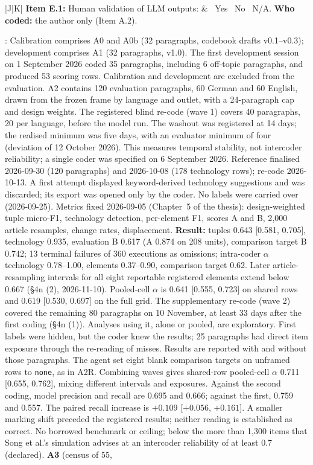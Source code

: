 \documentclass[12pt]{article}
\providecommand{\checked}{\ding{110}}   %
\providecommand{\unchecked}{\ding{111}} %
\begin{document}
{\begin{longtable}{|J|K|}
\textbf{Item E.1:} Human validation of LLM outputs:
&
\checked~Yes \quad \unchecked~No \quad \unchecked~N/A. \textbf{Who coded:} the author only (Item A.2).\par\smallskip
{}: Calibration comprises A0 and A0b (32 paragraphs, codebook drafts v0.1--v0.3); development comprises A1 (32 paragraphs, v1.0). The first development session on 1 September 2026 coded 35 paragraphs, including 6 off-topic paragraphs, and produced 53 scoring rows. Calibration and development are excluded from the evaluation. A2 contains 120 evaluation paragraphs, 60 German and 60 English, drawn from the frozen frame by language and outlet, with a 24-paragraph cap and design weights. The registered blind re-code (wave 1) covers 40 paragraphs, 20 per language, before the model run. The washout was registered at 14 days; the realised minimum was five days, with an evaluator minimum of four (deviation of 12 October 2026). This measures temporal stability, not intercoder reliability; a single coder was specified on 6 September 2026. Reference finalised 2026-09-30 (120 paragraphs) and 2026-10-08 (178 technology rows); re-code 2026-10-13. A first attempt displayed keyword-derived technology suggestions and was discarded; its export was opened only by the coder. No labels were carried over (2026-09-25). Metrics fixed 2026-09-05 (Chapter~5 of the thesis): design-weighted tuple micro-F1, technology detection, per-element F1, scores A and B, 2{,}000 article resamples, change rates, displacement. \textbf{Result:} tuples 0.643 [0.581, 0.705], technology 0.935, evaluation B 0.617 (A 0.874 on 208 units), comparison target B 0.742; 13 terminal failures of 360 executions as omissions; intra-coder $\alpha$ technology 0.78--1.00, elements 0.37--0.90, comparison target 0.62. Later article-resampling intervals for all eight reportable registered elements extend below 0.667 (\S4n (2), 2026-11-10). Pooled-cell $\alpha$ is 0.641 [0.555, 0.723] on shared rows and 0.619 [0.530, 0.697] on the full grid. The supplementary re-code (wave 2) covered the remaining 80 paragraphs on 10 November, at least 33 days after the first coding (\S4n (1)). Analyses using it, alone or pooled, are exploratory. First labels were hidden, but the coder knew the results; 25 paragraphs had direct item exposure through the re-reading of misses. Results are reported with and without those paragraphs. The agent set eight blank comparison targets on unframed rows to \texttt{none}, as in A2R. Combining waves gives shared-row pooled-cell $\alpha$ 0.711 [0.655, 0.762], mixing different intervals and exposures. Against the second coding, model precision and recall are 0.695 and 0.666; against the first, 0.759 and 0.557. The paired recall increase is $+0.109$ [$+0.056$, $+0.161$]. A smaller marking shift preceded the registered results; neither reading is established as correct. No borrowed benchmark or ceiling; below the more than 1{,}300 items that Song et al.'s simulation advises at an intercoder reliability of at least 0.7 (declared). \textbf{A3} (census of 55, 
\end{longtable}}
\end{document}
